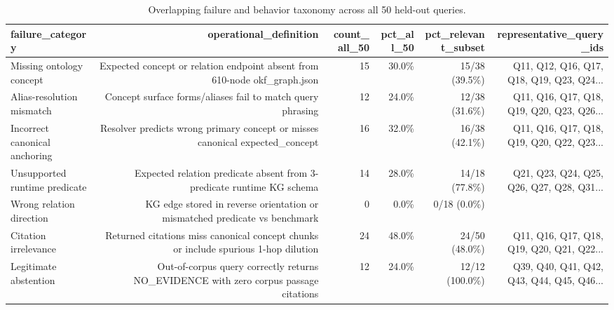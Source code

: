 \begin{table}[t]
\centering
\small
\caption{Overlapping failure and behavior taxonomy across all 50 held-out queries.}
\label{tab:t5_failure_taxonomy}
\begin{tabular}{lrrrrr}
\toprule
\textbf{failure\_category} & \textbf{operational\_definition} & \textbf{count\_all\_50} & \textbf{pct\_all\_50} & \textbf{pct\_relevant\_subset} & \textbf{representative\_query\_ids} \\
\midrule
Missing ontology concept & Expected concept or relation endpoint absent from 610-node okf\_graph.json & 15 & 30.0\% & 15/38 (39.5\%) & Q11, Q12, Q16, Q17, Q18, Q19, Q23, Q24... \\
Alias-resolution mismatch & Concept surface forms/aliases fail to match query phrasing & 12 & 24.0\% & 12/38 (31.6\%) & Q11, Q16, Q17, Q18, Q19, Q20, Q23, Q26... \\
Incorrect canonical anchoring & Resolver predicts wrong primary concept or misses canonical expected\_concept & 16 & 32.0\% & 16/38 (42.1\%) & Q11, Q16, Q17, Q18, Q19, Q20, Q22, Q23... \\
Unsupported runtime predicate & Expected relation predicate absent from 3-predicate runtime KG schema & 14 & 28.0\% & 14/18 (77.8\%) & Q21, Q23, Q24, Q25, Q26, Q27, Q28, Q31... \\
Wrong relation direction & KG edge stored in reverse orientation or mismatched predicate vs benchmark & 0 & 0.0\% & 0/18 (0.0\%) &  \\
Citation irrelevance & Returned citations miss canonical concept chunks or include spurious 1-hop dilution & 24 & 48.0\% & 24/50 (48.0\%) & Q11, Q16, Q17, Q18, Q19, Q20, Q21, Q22... \\
Legitimate abstention & Out-of-corpus query correctly returns NO\_EVIDENCE with zero corpus passage citations & 12 & 24.0\% & 12/12 (100.0\%) & Q39, Q40, Q41, Q42, Q43, Q44, Q45, Q46... \\
\bottomrule
\end{tabular}
\end{table}
